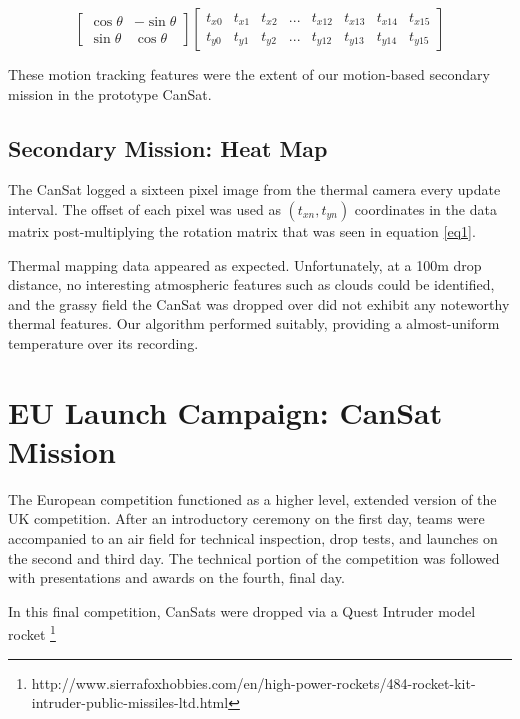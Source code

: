 \documentclass[]{report}
\begin{document}
	\begin{center}
	\begin{equation} \label{eq1}	
	\begin{bmatrix}
	\cos\theta & -\sin\theta \\
	\sin\theta & \cos\theta
	\end{bmatrix}	
	\begin{bmatrix}
	t_{x0} & t_{x1} & t_{x2} & . . . & t_{x12} & t_{x13} & t_{x14} & t_{x15} \\
	t_{y0} & t_{y1} & t_{y2} & . . . & t_{y12} & t_{y13} & t_{y14} & t_{y15}
	\end{bmatrix}
	\end{equation}
	\end{center}

	These motion tracking features were the extent of our motion-based secondary mission in the prototype CanSat. 
	
	\subsection{Secondary Mission: Heat Map}
	
	The CanSat logged a sixteen pixel image from the thermal camera every update interval. The offset of each pixel was used as $(t_{xn}, t_{yn})$ coordinates in the data matrix post-multiplying the rotation matrix that was seen in equation \ref{eq1}.
	
	Thermal mapping data appeared as expected. Unfortunately, at a 100m drop distance, no interesting atmospheric features such as clouds could be identified, and the grassy field the CanSat was dropped over did not exhibit any noteworthy thermal features. Our algorithm performed suitably, providing a almost-uniform temperature over its recording.
		
	\section{EU Launch Campaign: CanSat Mission}
	
	The European competition functioned as a higher level, extended version of the UK competition. After an introductory ceremony on the first day, teams were accompanied to an air field for technical inspection, drop tests, and launches on the second and third day. The technical portion of the competition was followed with presentations and awards on the fourth, final day. 
	
	In this final competition, CanSats were dropped via a Quest Intruder model rocket \footnote{http://www.sierrafoxhobbies.com/en/high-power-rockets/484-rocket-kit-intruder-public-missiles-ltd.html}
	
\end{document}
